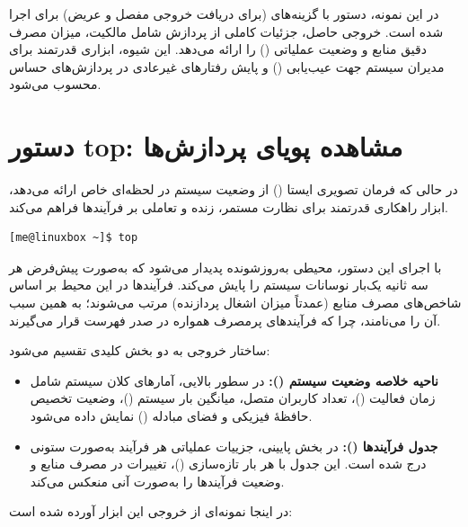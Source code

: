 در این نمونه، دستور  با گزینه‌های  (برای دریافت خروجی مفصل و عریض) برای  اجرا شده است. خروجی حاصل، جزئیات کاملی از پردازش  شامل مالکیت، میزان مصرف دقیق منابع و وضعیت عملیاتی () را ارائه می‌دهد. این شیوه، ابزاری قدرتمند برای مدیران سیستم جهت عیب‌یابی () و پایش رفتارهای غیرعادی در پردازش‌های حساس محسوب می‌شود.

\section{دستور top: مشاهده پویای پردازش‌ها}

در حالی که فرمان  تصویری ایستا () از وضعیت سیستم در لحظه‌ای خاص ارائه می‌دهد، ابزار  راهکاری قدرتمند برای نظارت مستمر، زنده و تعاملی بر فرآیندها فراهم می‌کند.

\begin{latin}
\begin{lstlisting}
[me@linuxbox ~]$ top
\end{lstlisting}
\end{latin}

با اجرای این دستور، محیطی به‌روز‌شونده پدیدار می‌شود که به‌صورت پیش‌فرض هر سه ثانیه یک‌بار نوسانات سیستم را پایش می‌کند. فرآیندها در این محیط بر اساس شاخص‌های مصرف منابع (عمدتاً میزان اشغال پردازنده) مرتب می‌شوند؛ به همین سبب آن را  می‌نامند، چرا که فرآیندهای پرمصرف همواره در صدر فهرست قرار می‌گیرند.

ساختار خروجی  به دو بخش کلیدی تقسیم می‌شود:

\begin{itemize}
  \item \textbf{ناحیه خلاصه وضعیت سیستم ():} در سطور بالایی، آمارهای کلان سیستم شامل زمان فعالیت ()، تعداد کاربران متصل، میانگین بار سیستم ()، وضعیت تخصیص حافظهٔ فیزیکی و فضای مبادله () نمایش داده می‌شود.
  \item \textbf{جدول فرآیندها ():} در بخش پایینی، جزییات عملیاتی هر فرآیند به‌صورت ستونی درج شده است. این جدول با هر بار تازه‌سازی ()، تغییرات در مصرف منابع و وضعیت فرآیندها را به‌صورت آنی منعکس می‌کند.
\end{itemize}

در اینجا نمونه‌ای از خروجی این ابزار آورده شده است:

